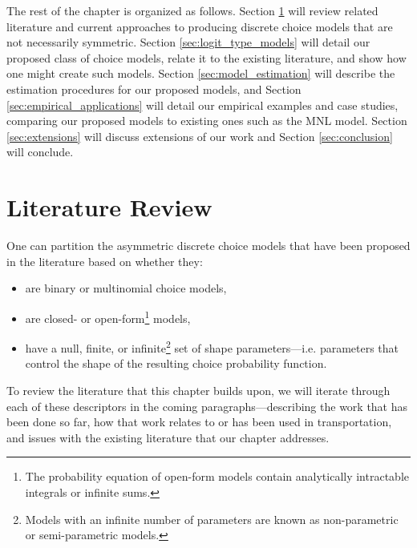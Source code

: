 The rest of the chapter is organized as follows. Section \ref{sec:lit_review} will review related literature and current approaches to producing discrete choice models that are not necessarily symmetric. Section \ref{sec:logit_type_models} will detail our proposed class of choice models, relate it to the existing literature, and show how one might create such models. Section \ref{sec:model_estimation} will describe the estimation procedures for our proposed models, and Section \ref{sec:empirical_applications} will detail our empirical examples and case studies, comparing our proposed models to existing ones such as the MNL model. Section \ref{sec:extensions} will discuss extensions of our work and Section \ref{sec:conclusion} will conclude.

\section{Literature Review}
\label{sec:lit_review}
One can partition the asymmetric discrete choice models that have been proposed in the literature based on whether they:
\begin{itemize}
\item are binary or multinomial choice models,
\item are closed- or open-form\footnote{The probability equation of open-form models contain analytically intractable integrals or infinite sums.} models,
\item have a null, finite, or infinite\footnote{Models with an infinite number of parameters are known as non-parametric or semi-parametric models.} set of shape parameters---i.e. parameters that control the shape of the resulting choice probability function.
\end{itemize}
To review the literature that this chapter builds upon, we will iterate through each of these descriptors in the coming paragraphs---describing the work that has been done so far, how that work relates to or has been used in transportation, and issues with the existing literature that our chapter addresses.

